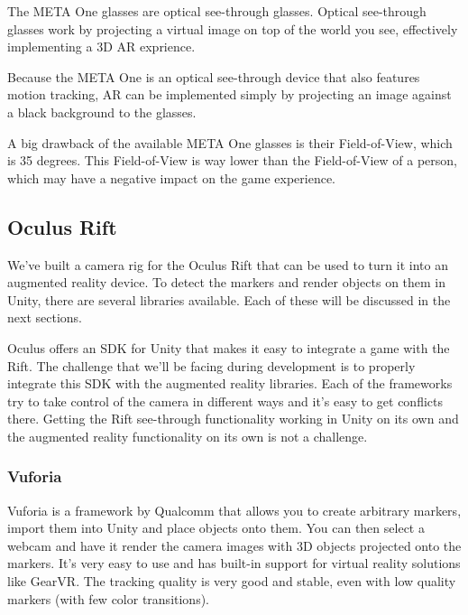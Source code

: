 			The META One glasses are optical see-through glasses. Optical
			see-through glasses work by projecting a virtual image on top of the
			world you see, effectively implementing a 3D AR exprience.

			Because the META One is an optical see-through device that also
			features motion tracking, AR can be implemented simply by
			projecting an image against a black background to the glasses.

			A big drawback of the available META One glasses is their
			Field-of-View, which is 35 degrees. This Field-of-View is way lower
			than the Field-of-View of a person, which may have a negative impact
			on the game experience.

		\subsection{Oculus Rift} \label{ssec:oculusrift}
			We've built a camera rig for the Oculus Rift that can be used to
			turn it into an augmented reality device. To detect the markers and
			render objects on them in Unity, there are several libraries
			available. Each of these will be discussed in the next sections.

			Oculus offers an SDK for Unity that makes it easy to integrate a
			game with the Rift. The challenge that we'll be facing during
			development is to properly integrate this SDK with the augmented
			reality libraries. Each of the frameworks try to take control of the
			camera in different ways and it's easy to get conflicts there.
			Getting the Rift see-through functionality working in Unity on its
			own and the augmented reality functionality on its own is not a
			challenge.

			\subsubsection{Vuforia} \label{sssec:vuforia}
				Vuforia is a framework by Qualcomm that allows you to create
				arbitrary markers, import them into Unity and place objects onto
				them. You can then select a webcam and have it render the camera
				images with 3D objects projected onto the markers. It's very
				easy to use and has built-in support for virtual reality
				solutions like GearVR. The tracking quality is very good and
				stable, even with low quality markers (with few color transitions).


